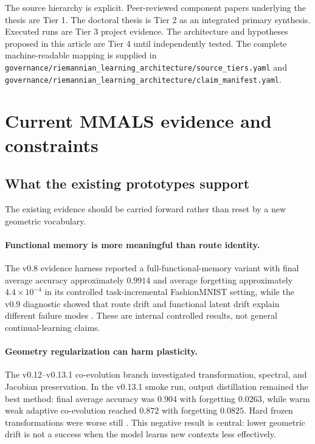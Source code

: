 \begin{sourcebox}
The source hierarchy is explicit. Peer-reviewed component papers underlying the thesis are Tier 1. The doctoral thesis is Tier 2 as an integrated primary synthesis. Executed \MMALS{} runs are Tier 3 project evidence. The architecture and hypotheses proposed in this article are Tier 4 until independently tested. The complete machine-readable mapping is supplied in \texttt{governance/riemannian\_learning\_architecture/source\_tiers.yaml} and \texttt{governance/riemannian\_learning\_architecture/claim\_manifest.yaml}.
\end{sourcebox}


\section{Current MMALS evidence and constraints}

\subsection{What the existing prototypes support}
The existing evidence should be carried forward rather than reset by a new geometric vocabulary.

\paragraph{Functional memory is more meaningful than route identity.}
The v0.8 evidence harness reported a full-functional-memory variant with final average accuracy approximately $0.9914$ and average forgetting approximately $4.4\times 10^{-4}$ in its controlled task-incremental FashionMNIST setting, while the v0.9 diagnostic showed that route drift and functional latent drift explain different failure modes \citep{harbonnier2026v08,harbonnier2026v09}. These are internal controlled results, not general continual-learning claims.

\paragraph{Geometry regularization can harm plasticity.}
The v0.12--v0.13.1 co-evolution branch investigated transformation, spectral, and Jacobian preservation. In the v0.13.1 smoke run, output distillation remained the best method: final average accuracy was $0.904$ with forgetting $0.0263$, while warm weak adaptive co-evolution reached $0.872$ with forgetting $0.0825$. Hard frozen transformations were worse still \citep{harbonnier2026v12,harbonnier2026v131}. This negative result is central: lower geometric drift is not a success when the model learns new contexts less effectively.


